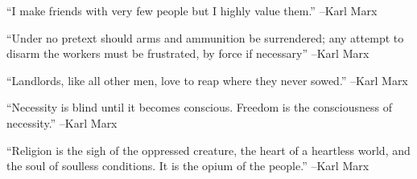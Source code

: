 \documentclass{article}%
\begin{document}
\linebreak%
\vspace{1mm}%
\begin{minipage}{\textwidth}%
\flushleft%
“I make friends with very few people but I highly value them.”%
\linebreak%
\vspace{1mm}%
–Karl Marx%
\linebreak%
\vspace{1mm}%
\end{minipage}%
\linebreak%
\vspace{1mm}%
\begin{minipage}{\textwidth}%
\flushleft%
“Under no pretext should arms and ammunition be surrendered; any attempt to disarm the workers must be frustrated, by force if necessary”%
\linebreak%
\vspace{1mm}%
–Karl Marx%
\linebreak%
\vspace{1mm}%
\end{minipage}%
\linebreak%
\vspace{1mm}%
\begin{minipage}{\textwidth}%
\flushleft%
“Landlords, like all other men, love to reap where they never sowed.”%
\linebreak%
\vspace{1mm}%
–Karl Marx%
\linebreak%
\vspace{1mm}%
\end{minipage}%
\linebreak%
\vspace{1mm}%
\begin{minipage}{\textwidth}%
\flushleft%
“Necessity is blind until it becomes conscious. Freedom is the consciousness of necessity.”%
\linebreak%
\vspace{1mm}%
–Karl Marx%
\linebreak%
\vspace{1mm}%
\end{minipage}%
\linebreak%
\vspace{1mm}%
\begin{minipage}{\textwidth}%
\flushleft%
“Religion is the sigh of the oppressed creature, the heart of a heartless world, and the soul of soulless conditions. It is the opium of the people.”%
\linebreak%
\vspace{1mm}%
–Karl Marx%
\linebreak%
\vspace{1mm}%
\end{minipage}%
\end{document}
